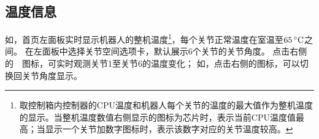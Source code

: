 
\subsection{温度信息}
如，\LM 首页左面板实时显示机器人的整机温度\footnote{取控制箱内控制器的CPU温度和机器人每个关节的温度的最大值作为整机温度的显示。当整机温度数值右侧显示的图标为芯片时，表示当前CPU温度值最高；当显示一个关节加数字图标时，表示该数字对应的关节温度较高。}，每个关节正常温度在室温至$65\,\mathrm{^\circ C}$之间。
在左面板中选择关节空间选项卡，默认展示6个关节的关节角度。
点击右侧的~~图标，可实时观测关节1至关节6的温度变化；
如，点击右侧的图标，可以切换回关节角度显示。



